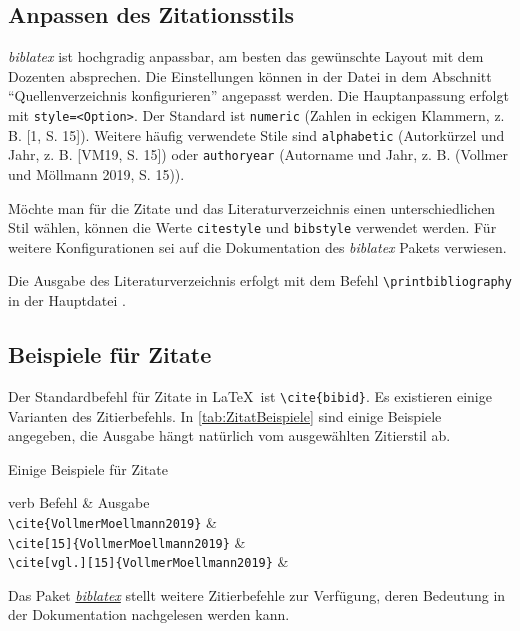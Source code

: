 \subsection{Anpassen des Zitationsstils}
\textit{biblatex} ist hochgradig anpassbar, am besten das gewünschte Layout mit dem Dozenten absprechen. Die Einstellungen können in der Datei  in dem Abschnitt \enquote{Quellenverzeichnis konfigurieren} angepasst werden. Die Hauptanpassung erfolgt mit \verb|style=<Option>|. Der Standard ist \verb|numeric| (Zahlen in eckigen Klammern, z. B. [1, S. 15]). Weitere häufig verwendete Stile sind \verb|alphabetic| (Autorkürzel und Jahr, z. B. [VM19, S. 15]) oder \verb|authoryear| (Autorname und Jahr, z. B. (Vollmer und Möllmann 2019, S. 15)).

Möchte man für die Zitate und das Literaturverzeichnis einen unterschiedlichen Stil wählen, können die Werte \verb|citestyle| und \verb|bibstyle| verwendet werden. Für weitere Konfigurationen sei auf die Dokumentation des \textit{biblatex} Pakets verwiesen.

Die Ausgabe des Literaturverzeichnis erfolgt mit dem Befehl \verb|\printbibliography| in der Hauptdatei .
 
\subsection{Beispiele für Zitate}
Der Standardbefehl für Zitate in \LaTeX\ ist \verb|\cite{bibid}|. Es existieren einige Varianten des Zitierbefehls. In \vref{tab:ZitatBeispiele} sind einige Beispiele angegeben, die Ausgabe hängt natürlich vom ausgewählten Zitierstil ab.

\begin{table}[h]
\centering
\caption{Einige Beispiele für Zitate}
\label{tab:ZitatBeispiele}
\begin{tblr}{verb}
	\toprule
	 Befehl & Ausgabe \\ \midrule
	\verb|\cite{VollmerMoellmann2019}| & \cite{VollmerMoellmann2019} \\
	\verb|\cite[15]{VollmerMoellmann2019}| & \cite[15]{VollmerMoellmann2019} \\
	\verb|\cite[vgl.][15]{VollmerMoellmann2019}| & \cite[vgl.][15]{VollmerMoellmann2019} \\
	\bottomrule
\end{tblr}
\end{table}

Das Paket \href{https://ctan.org/pkg/biblatex?lang=de}{\textit{biblatex}} stellt weitere Zitierbefehle zur Verfügung, deren Bedeutung in der Dokumentation nachgelesen werden kann.